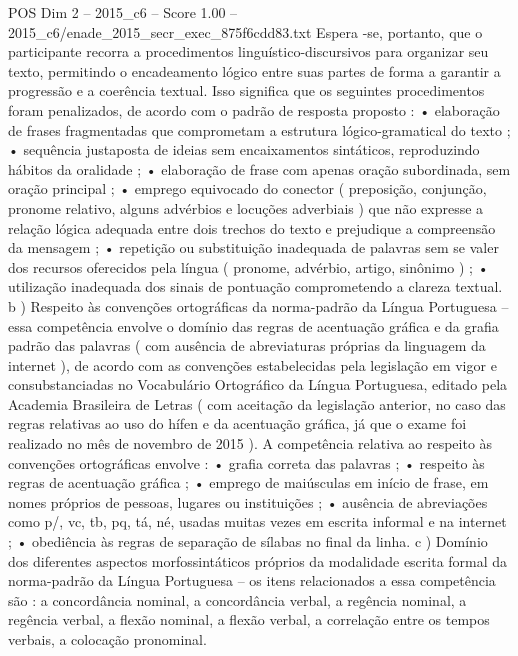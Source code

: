 \begin{textsample}{POS Dim 2 – 2015\_c6 – Score 1.00 – 2015\_c6/enade\_2015\_secr\_exec\_875f6cdd83.txt}
Espera -se, portanto, que o participante recorra a procedimentos linguístico-discursivos para organizar seu texto, permitindo o encadeamento lógico entre suas partes de forma a garantir a progressão e a coerência textual.
Isso significa que os seguintes procedimentos foram penalizados, de acordo com o padrão de resposta proposto : • elaboração de frases fragmentadas que comprometam a estrutura lógico-gramatical do texto ; • sequência justaposta de ideias sem encaixamentos sintáticos, reproduzindo hábitos da oralidade ; • elaboração de frase com apenas oração subordinada, sem oração principal ; • emprego equivocado do conector ( preposição, conjunção, pronome relativo, alguns advérbios e locuções adverbiais ) que não expresse a relação lógica adequada entre dois trechos do texto e prejudique a compreensão da mensagem ; • repetição ou substituição inadequada de palavras sem se valer dos recursos oferecidos pela língua ( pronome, advérbio, artigo, sinônimo ) ; • utilização inadequada dos sinais de pontuação comprometendo a clareza textual. b ) Respeito às convenções ortográficas da norma-padrão da Língua Portuguesa – essa competência envolve o domínio das regras de acentuação gráfica e da grafia padrão das palavras ( com ausência de abreviaturas próprias da linguagem da internet ), de acordo com as convenções estabelecidas pela legislação em vigor e consubstanciadas no Vocabulário Ortográfico da Língua Portuguesa, editado pela Academia Brasileira de Letras ( com aceitação da legislação anterior, no caso das regras relativas ao uso do hífen e da acentuação gráfica, já que o exame foi realizado no mês de novembro de 2015 ).
A competência relativa ao respeito às convenções ortográficas envolve : • grafia correta das palavras ; • respeito às regras de acentuação gráfica ; • emprego de maiúsculas em início de frase, em nomes próprios de pessoas, lugares ou instituições ; • ausência de abreviações como p/, vc, tb, pq, tá, né, usadas muitas vezes em escrita informal e na internet ; • obediência às regras de separação de sílabas no final da linha. c ) Domínio dos diferentes aspectos morfossintáticos próprios da modalidade escrita formal da norma-padrão da Língua Portuguesa – os itens relacionados a essa competência são : a concordância nominal, a concordância verbal, a regência nominal, a regência verbal, a flexão nominal, a flexão verbal, a correlação entre os tempos verbais, a colocação pronominal.

\end{textsample}
